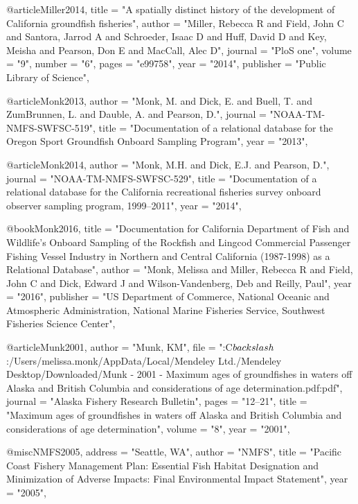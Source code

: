 @article{Miller2014,
    title = "{A spatially distinct history of the development of California groundfish fisheries}",
    author = "{Miller, Rebecca R and Field, John C and Santora, Jarrod A and Schroeder, Isaac D and Huff, David D and Key, Meisha and Pearson, Don E and MacCall, Alec D}",
    journal = "{PloS one}",
    volume = "{9}",
    number = "{6}",
    pages = "{e99758}",
    year = "{2014}",
    publisher = "{Public Library of Science}",
}

@article{Monk2013,
    author = "{Monk, M. and Dick, E. and Buell, T. and ZumBrunnen, L. and Dauble, A. and Pearson, D.}",
    journal = "{NOAA-TM-NMFS-SWFSC-519}",
    title = "{{Documentation of a relational database for the Oregon Sport Groundfish Onboard Sampling Program}}",
    year = "{2013}",
}

@article{Monk2014,
    author = "{Monk, M.H. and Dick, E.J. and Pearson, D.}",
    journal = "{NOAA-TM-NMFS-SWFSC-529}",
    title = "{{Documentation of a relational database for the California recreational fisheries survey onboard observer sampling program, 1999--2011}}",
    year = "{2014}",
}

@book{Monk2016,
    title = "{Documentation for California Department of Fish and Wildlife's Onboard Sampling of the Rockfish and Lingcod Commercial Passenger Fishing Vessel Industry in Northern and Central California (1987-1998) as a Relational Database}",
    author = "{Monk, Melissa and Miller, Rebecca R and Field, John C and Dick, Edward J and Wilson-Vandenberg, Deb and Reilly, Paul}",
    year = "{2016}",
    publisher = "{US Department of Commerce, National Oceanic and Atmospheric Administration, National Marine Fisheries Service, Southwest Fisheries Science Center}",
}

@article{Munk2001,
    author = "{Munk, KM}",
    file = "{:C$\\backslash$:/Users/melissa.monk/AppData/Local/Mendeley Ltd./Mendeley Desktop/Downloaded/Munk - 2001 - Maximum ages of groundfishes in waters off Alaska and British Columbia and considerations of age determination.pdf:pdf}",
    journal = "{Alaska Fishery Research Bulletin}",
    pages = "{12--21}",
    title = "{{Maximum ages of groundfishes in waters off Alaska and British Columbia and considerations of age determination}}",
    volume = "{8}",
    year = "{2001}",
}

@misc{NMFS2005,
    address = "{Seattle, WA}",
    author = "{NMFS}",
    title = "{{Pacific Coast Fishery Management Plan: Essential Fish Habitat Designation and Minimization of Adverse Impacts: Final Environmental Impact Statement}}",
    year = "{2005}",
}

